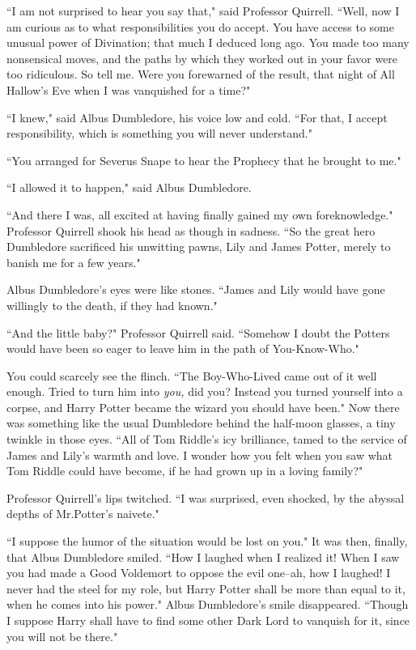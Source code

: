 ``I am not surprised to hear you say that," said Professor Quirrell. ``Well, now I am curious as to what responsibilities you do accept. You have access to some unusual power of Divination; that much I deduced long ago. You made too many nonsensical moves, and the paths by which they worked out in your favor were too ridiculous. So tell me. Were you forewarned of the result, that night of All Hallow's Eve when I was vanquished for a time?"

``I knew," said Albus Dumbledore, his voice low and cold. ``For that, I accept responsibility, which is something you will never understand."

``You arranged for Severus Snape to hear the Prophecy that he brought to me."

``I allowed it to happen," said Albus Dumbledore.

``And there I was, all excited at having finally gained my own foreknowledge." Professor Quirrell shook his head as though in sadness. ``So the great hero Dumbledore sacrificed his unwitting pawns, Lily and James Potter, merely to banish me for a few years."

Albus Dumbledore's eyes were like stones. ``James and Lily would have gone willingly to the death, if they had known."

``And the little baby?" Professor Quirrell said. ``Somehow I doubt the Potters would have been so eager to leave him in the path of You-Know-Who."

You could scarcely see the flinch. ``The Boy-Who-Lived came out of it well enough. Tried to turn him into \emph{you,} did you? Instead you turned yourself into a corpse, and Harry Potter became the wizard you should have been." Now there was something like the usual Dumbledore behind the half-moon glasses, a tiny twinkle in those eyes. ``All of Tom Riddle's icy brilliance, tamed to the service of James and Lily's warmth and love. I wonder how you felt when you saw what Tom Riddle could have become, if he had grown up in a loving family?"

Professor Quirrell's lips twitched. ``I was surprised, even shocked, by the abyssal depths of Mr.\?Potter's naivete."

``I suppose the humor of the situation would be lost on you." It was then, finally, that Albus Dumbledore smiled. ``How I laughed when I realized it! When I saw you had made a Good Voldemort to oppose the evil one\---ah, how I laughed! I never had the steel for my role, but Harry Potter shall be more than equal to it, when he comes into his power." Albus Dumbledore's smile disappeared. ``Though I suppose Harry shall have to find some other Dark Lord to vanquish for it, since you will not be there."

